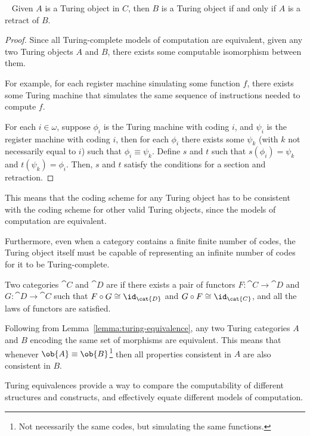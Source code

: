   \begin{lemma}~\label{lemma:turing-equivalence}
    Given $A$ is a Turing object in $C$, then $B$ is a Turing object
    if and only if $A$ is a retract of $B$.

    \begin{proof}
      Since all Turing-complete models of computation are equivalent, 
      given any two Turing objects $A$ and $B$,
      there exists some computable isomorphism between them.

      For example, for each register machine simulating some
      function $f$, there exists
      some Turing machine that simulates the same
      sequence of instructions needed
      to compute $f$.

      For each $i \in \omega$, suppose $\phi_i$ is the Turing machine
      with coding $i$, and $\psi_i$ is the register machine with coding $i$,
      then for each $\phi_i$ there exists some $\psi_k$
      (with $k$ not necessarily equal to $i$) such that $\phi_i \equiv \psi_k$.
      Define $s$ and $t$ such that $s(\phi_i) = \psi_k$ and $t(\psi_k) = \phi_i$.
      Then, $s$ and $t$ satisfy the conditions for a section and retraction.
    \end{proof}

    This means that the coding scheme for any Turing object
    has to be consistent with the coding scheme for other valid
    Turing objects, since the models of computation are equivalent.

    Furthermore, even when a category contains a finite finite number
    of codes,
    the Turing object itself must be capable of representing
    an infinite number of codes for it to be Turing-complete.
  \end{lemma}

  \step
  \begin{definition}
    Two categories $\cat{C}$ and $\cat{D}$ are 
    if there exists a pair of functors $F : \cat{C} \to \cat{D}$ and
    $G : \cat{D} \to \cat{C}$ such that $F \circ G \cong \id_{\cat{D}}$
    and $G \circ F \cong \id_{\cat{C}}$, and all the laws of functors
    are satisfied.
  \end{definition}

  Following from Lemma~\ref{lemma:turing-equivalence},
  any two Turing categories $A$ and $B$ encoding the same set
  of morphisms are equivalent. This means that
  whenever $\ob{A} \equiv \ob{B}$\footnote[1]{
    Not necessarily the same codes, but simulating the same functions.
  } then all properties consistent in $A$ are also consistent in $B$.

  Turing equivalences provide a way to compare the computability
  of different structures and constructs, and effectively
  equate different models of computation.
